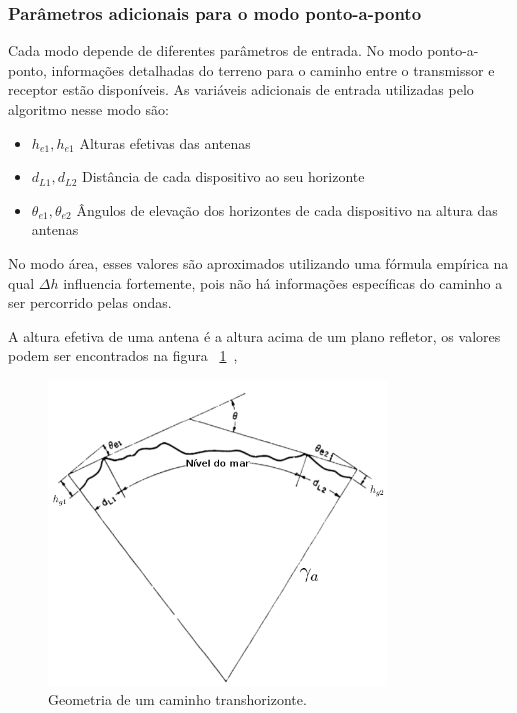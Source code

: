 \subsubsection{Parâmetros adicionais para o modo ponto-a-ponto}

Cada modo depende de diferentes parâmetros de entrada. No modo ponto-a-ponto, informações detalhadas do terreno para o caminho entre o transmissor e receptor estão disponíveis. As variáveis adicionais de entrada utilizadas pelo algoritmo nesse modo são:

\begin{itemize}
\item \begin{math}h_{e1}, h_{e1}\end{math} Alturas efetivas das antenas
\item \begin{math}d_{L1},d_{L2}\end{math} Distância de cada dispositivo ao seu horizonte
\item \begin{math}\theta_{e1}, \theta_{e2}\end{math} Ângulos de elevação dos horizontes de cada dispositivo na altura das antenas
\end{itemize}

No modo área, esses valores são aproximados utilizando uma fórmula empírica na qual $\Delta h$ influencia fortemente, pois não há informações específicas do caminho a ser percorrido pelas ondas.

A altura efetiva de uma antena é a altura acima de um plano refletor, os valores podem ser encontrados na figura ~\ref{fig:radiohorizon}~\cite{longleyrice}, 

\begin{figure}[radiohorizon]
\centering
\includegraphics[width=0.8\textwidth]{figs/radiohorizon}
\caption[Geometria de um caminho transhorizonte.]
{Geometria de um caminho transhorizonte.}
\label{fig:radiohorizon}
\end{figure}

